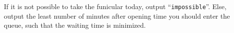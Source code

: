 
    If it is not possible to take the funicular today, output ``\texttt{impossible}''.
    Else, output the least number of minutes after opening time you should enter the queue,
    such that the waiting time is minimized.
